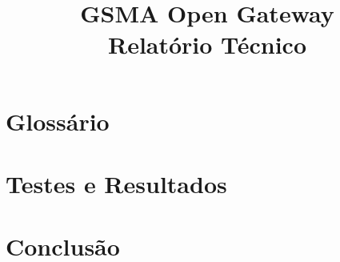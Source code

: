 \documentclass[code,math,bibliography]{relatorio-deti}
\title{GSMA Open Gateway\\[20pt]Relatório Técnico}
\begin{document}
\maketitle

%
%



\tableofcontents

\chapter*{Glossário}
\thispagestyle{empty}



\clearpage





\chapter{Testes e Resultados}

\chapter{Conclusão}

\printbibliography[heading=bibintoc]
\end{document}

